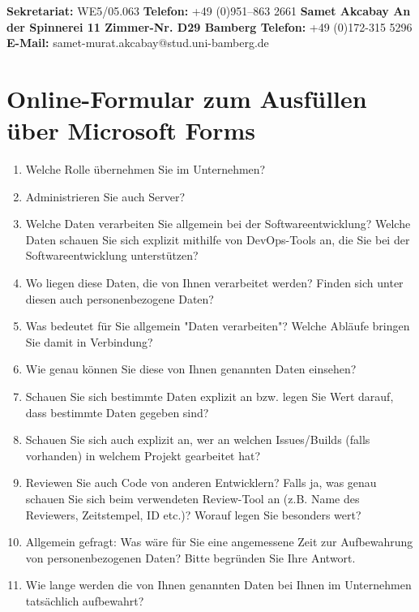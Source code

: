 \textbf{Sekretariat:} WE5/05.063\newline 
\textbf{Telefon:} +49 (0)951–863 2661\newline \newline
\textbf{Samet Akcabay\newline
An der Spinnerei 11 Zimmer-Nr. D29  Bamberg\newline \newline
Telefon:} +49 (0)172-315 5296 \newline
\textbf{E-Mail:} samet-murat.akcabay@stud.uni-bamberg.de


\section{Online-Formular zum Ausfüllen über Microsoft Forms} \label{forms}
\begin{enumerate}
    \item Welche Rolle übernehmen Sie im Unternehmen?
    \item Administrieren Sie auch Server?
    \item Welche Daten verarbeiten Sie allgemein bei der Softwareentwicklung? Welche Daten schauen Sie sich explizit mithilfe von DevOps-Tools an, die Sie bei der Softwareentwicklung unterstützen?
    \item Wo liegen diese Daten, die von Ihnen verarbeitet werden? Finden sich unter diesen auch personenbezogene Daten?
    \item Was bedeutet für Sie allgemein "Daten verarbeiten"? Welche Abläufe bringen Sie damit in Verbindung?
    \item Wie genau können Sie diese von Ihnen genannten Daten einsehen?
    \item Schauen Sie sich bestimmte Daten explizit an bzw. legen Sie Wert darauf, dass bestimmte Daten gegeben sind?
    \item Schauen Sie sich auch explizit an, wer an welchen Issues/Builds (falls vorhanden) in welchem Projekt gearbeitet hat?
    \item Reviewen Sie auch Code von anderen Entwicklern? Falls ja, was genau schauen Sie sich beim verwendeten Review-Tool an (z.B. Name des Reviewers, Zeitstempel, ID etc.)? Worauf legen Sie besonders wert?
    \item Allgemein gefragt: Was wäre für Sie eine angemessene Zeit zur Aufbewahrung von personenbezogenen Daten? Bitte begründen Sie Ihre Antwort.
    \item Wie lange werden die von Ihnen genannten Daten bei Ihnen im Unternehmen tatsächlich aufbewahrt?

\end{enumerate}
